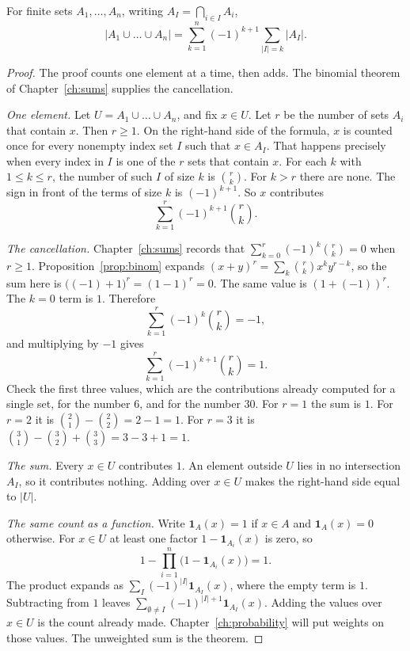 \begin{theorem}\label{thm:incexc}
For finite sets $A_1,\dots,A_n$, writing $A_I=\bigcap_{i\in I}A_i$,
\[
\left|A_1\cup\dots\cup A_n\right|=\sum_{k=1}^n(-1)^{k+1}\sum_{|I|=k}|A_I|.
\]
\end{theorem}
\begin{proof}
The proof counts one element at a time, then adds. The binomial theorem of Chapter~\ref{ch:sums} supplies the cancellation.

\emph{One element.} Let $U=A_1\cup\dots\cup A_n$, and fix $x\in U$. Let $r$ be the number of sets $A_i$ that contain $x$. Then $r\ge 1$. On the right-hand side of the formula, $x$ is counted once for every nonempty index set $I$ such that $x\in A_I$. That happens precisely when every index in $I$ is one of the $r$ sets that contain $x$. For each $k$ with $1\le k\le r$, the number of such $I$ of size $k$ is $\binom rk$. For $k>r$ there are none. The sign in front of the terms of size $k$ is $(-1)^{k+1}$. So $x$ contributes
\[
\sum_{k=1}^r(-1)^{k+1}\binom rk.
\]

\emph{The cancellation.} Chapter~\ref{ch:sums} records that $\sum_{k=0}^r(-1)^k\binom rk=0$ when $r\ge 1$. Proposition~\ref{prop:binom} expands $(x+y)^r=\sum_k\binom rk x^k y^{r-k}$, so the sum here is $\bigl((-1)+1\bigr)^r=(1-1)^r=0$. The same value is $(1+(-1))^r$. The $k=0$ term is $1$. Therefore
\[
\sum_{k=1}^r(-1)^k\binom rk=-1,
\]
and multiplying by $-1$ gives
\[
\sum_{k=1}^r(-1)^{k+1}\binom rk=1.
\]
Check the first three values, which are the contributions already computed for a single set, for the number $6$, and for the number $30$. For $r=1$ the sum is $1$. For $r=2$ it is $\binom21-\binom22=2-1=1$. For $r=3$ it is $\binom31-\binom32+\binom33=3-3+1=1$.

\emph{The sum.} Every $x\in U$ contributes $1$. An element outside $U$ lies in no intersection $A_I$, so it contributes nothing. Adding over $x\in U$ makes the right-hand side equal to $|U|$.

\emph{The same count as a function.} Write $\mathbf 1_A(x)=1$ if $x\in A$ and $\mathbf 1_A(x)=0$ otherwise. For $x\in U$ at least one factor $1-\mathbf 1_{A_i}(x)$ is zero, so
\[
1-\prod_{i=1}^n\bigl(1-\mathbf 1_{A_i}(x)\bigr)=1.
\]
The product expands as $\sum_I(-1)^{|I|}\mathbf 1_{A_I}(x)$, where the empty term is $1$. Subtracting from $1$ leaves $\sum_{\emptyset\neq I}(-1)^{|I|+1}\mathbf 1_{A_I}(x)$. Adding the values over $x\in U$ is the count already made. Chapter~\ref{ch:probability} will put weights on those values. The unweighted sum is the theorem.
\end{proof}

